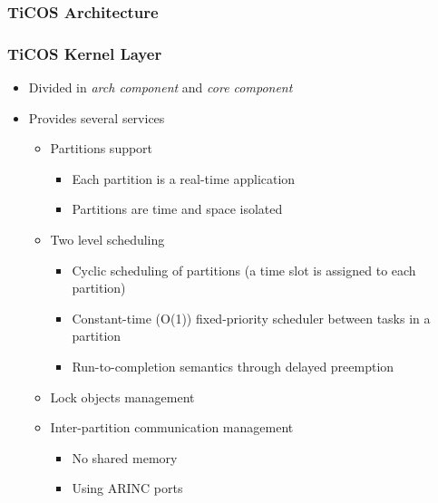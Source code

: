 \documentclass[notheorems]{beamer}
\begin{document}
\begin{frame}
\frametitle{TiCOS Architecture}

	\begin{figure}[!ht]
		\begin{center}
		\end{center}
		\label{OS_structure}
	\end{figure}

\end{frame}

\begin{frame}
\frametitle{TiCOS Kernel Layer}
\begin{itemize}
	\item Divided in \textit{arch component} and \textit{core component}
	\item Provides several services
		\begin{itemize}
			\item Partitions support
				\begin{itemize}
					\item Each partition is a real-time application
					\item Partitions are time and space isolated
				\end{itemize}
			\item Two level scheduling
				\begin{itemize}
					\item Cyclic scheduling of partitions (a time slot is assigned to each partition)
					\item Constant-time (O(1)) fixed-priority scheduler between tasks in a partition
					\item Run-to-completion semantics through delayed preemption
				\end{itemize}
			\item Lock objects management
			\item Inter-partition communication management
				\begin{itemize}
					\item No shared memory
					\item Using ARINC ports
				\end{itemize}
		\end{itemize}
\end{itemize}
\end{frame}

\end{document}
